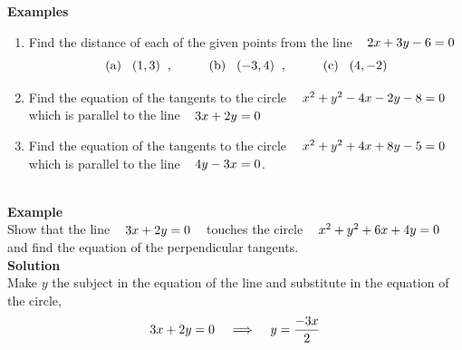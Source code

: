 \documentclass[11pt,a4paper]{article}
\begin{document}
\textbf{Examples}
\begin{enumerate}
\item Find the distance of each of the given points from the line $\hspace{0.3cm} 2x + 3y - 6 = 0$
$$(\text{a}) \hspace{0.3cm} (1,3)\hspace{0.2cm}, \hspace{1cm}  (\text{b}) \hspace{0.3cm} (-3,4)\hspace{0.2cm}, \hspace{1cm} (\text{c}) \hspace{0.3cm} (4,-2)$$

\item Find the equation of the tangents to the circle $\hspace{0.3cm} x^2 + y^2 - 4x - 2y - 8 = 0\hspace{0.3cm}$ which is parallel to the  line $\hspace{0.3cm} 3x + 2y = 0$

\item Find the equation of the tangents to the circle $\hspace{0.3cm} x^2 + y^2 + 4x + 8y - 5 = 0\hspace{0.3cm}$ which is parallel to the line $\hspace{0.3cm} 4y - 3x = 0$.\\\\
\end{enumerate}










\textbf{Example}\\
Show that the line $\hspace{0.3cm} 3x + 2y = 0\hspace{0.3cm}$ touches the circle $\hspace{0.3cm} x^2 + y^2 + 6x + 4y = 0\hspace{0.3cm}$ and find the equation of the perpendicular tangents.\\


\textbf{Solution}\\
Make $y$ the subject in the equation of the line and substitute in the equation of the circle, $$3x + 2y = 0 \hspace{0.3cm}\implies \hspace{0.3cm} y  = \dfrac{-3x}{2}$$
\end{document}
